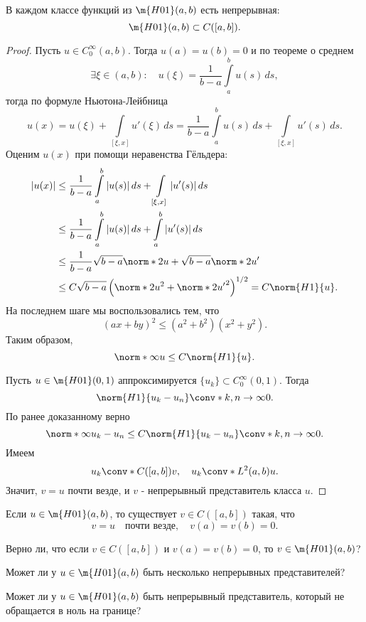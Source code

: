\begin{theorem} В каждом классе функций из $\m{H01}(a,b)$ есть непрерывная:
 $$ \m{H01}(a,b) \subset C([a,b]) .$$
\end{theorem}
\begin{proof}
Пусть $u \in C_0^\infty (a,b)$. Тогда $u(a) = u(b) = 0$ и по теореме о среднем
$$ \exists \xi \in (a,b): \quad u(\xi) = \frac{1}{b-a} \int \limits_a^b u(s) \, ds,$$
тогда по формуле Ньютона-Лейбница
$$ u(x) = u(\xi) + \int \limits_{[\xi, x]} u'(\xi) \, ds = \frac {1} {b-a} \int \limits_a^b u(s) \, ds + \int \limits_{[\xi, x]} u'(s) \, ds.$$
Оценим $u(x)$ при помощи неравенства Гёльдера:
\begin{align*}
|u(x)| &\leq \frac {1} {b-a} \int \limits_a^b |u(s)| \, ds + \int \limits_{[\xi, x]} |u'(s)| \, ds \\
&\leq \frac {1} {b-a} \int \limits_a^b |u(s)| \, ds + \int \limits_a^b |u'(s)| \, ds \\
&\leq \frac {1} {b-a} \sqrt{b-a} \norm*{2}{u} + \sqrt{b-a} \norm*{2}{u'} \\
&\leq C \sqrt{b-a} \left( \norm*{2}{u}^2 + \norm*{2}{u'}^2 \right)^{1/2} = C \norm{H1}{u}.
\end{align*}
На последнем шаге мы воспользовались тем, что
$$ (ax + by)^2 \leq (a^2 + b^2) (x^2 + y^2).$$
Таким образом,
$$ \norm*{\infty}{u} \leq C \norm{H1}{u}.$$

Пусть $u \in \m{H01} (0,1)$ аппроксимируется $\{ u_k \} \subset C_0^\infty (0,1)$. Тогда
$$ \norm{H1}{u_k - u_n} \conv*{}{k,n \to \infty} 0.$$
По ранее доказанному верно 
$$ \norm*{\infty}{u_k - u_n} \leq C \norm{H1}{u_k - u_n} \conv*{}{k,n \to \infty} 0.$$
Имеем 
$$ u_k \conv*{C([a,b])}{} v, \quad u_k \conv*{L^2(a,b)}{} u.$$
Значит, $v = u$ почти везде, и $v$ - непрерывный представитель класса $u$.  

\end{proof}


\begin{corollary} Если $u \in \m{H01} (a,b)$, то существует $v \in C([a,b])$ такая, что
$$ v = u \quad \text{почти везде}, \quad v(a) = v(b) = 0.$$
\end{corollary}

\begin{exercise} Верно ли, что если $v \in C([a,b])$ и $v(a) = v(b) = 0$, то $v \in \m{H01} (a,b)$?
\end{exercise}
\begin{exercise} Может ли у $u \in \m{H01} (a,b)$ быть несколько непрерывных представителей?
\end{exercise}
\begin{exercise} Может ли у $u \in \m{H01} (a,b)$ быть непрерывный представитель, который не обращается в ноль на границе?
\end{exercise}

